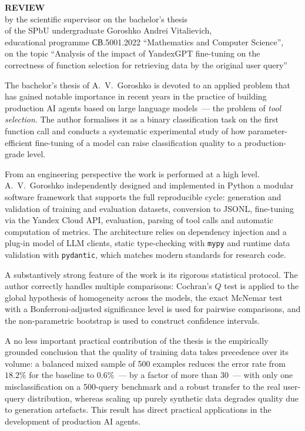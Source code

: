 \documentclass[12pt,a4paper]{article}
\begin{document}
\begin{center}
\Large\textbf{REVIEW}\\[0.3em]
\normalsize by the scientific supervisor on the bachelor's thesis\\
of the SPbU undergraduate Goroshko Andrei Vitalievich,\\
educational programme \mbox{СВ.5001.2022} ``Mathematics and Computer Science'',\\
on the topic ``Analysis of the impact of YandexGPT fine-tuning on the correctness of function selection for retrieving data by the original user query''
\end{center}

\vspace{0.8em}

The bachelor's thesis of A.~V.~Goroshko is devoted to an applied
problem that has gained notable importance in recent years in the
practice of building production AI agents based on large language
models~--- the problem of \textit{tool selection}. The author
formalises it as a binary classification task on the first function
call and conducts a systematic experimental study of how
parameter-efficient fine-tuning of a model can raise classification
quality to a production-grade level.

From an engineering perspective the work is performed at a high level.
A.~V.~Goroshko independently designed and implemented in Python a
modular software framework that supports the full reproducible cycle:
generation and validation of training and evaluation datasets,
conversion to JSONL, fine-tuning via the Yandex Cloud API, evaluation,
parsing of tool calls and automatic computation of metrics. The
architecture relies on dependency injection and a plug-in model of
LLM clients, static type-checking with \texttt{mypy} and runtime data
validation with \texttt{pydantic}, which matches modern standards for
research code.

A substantively strong feature of the work is its rigorous
statistical protocol. The author correctly handles multiple
comparisons: Cochran's $Q$ test is applied to the global hypothesis
of homogeneity across the models, the exact McNemar test with a
Bonferroni-adjusted significance level is used for pairwise
comparisons, and the non-parametric bootstrap is used to construct
confidence intervals.

A no less important practical contribution of the thesis is the
empirically grounded conclusion that the quality of training data
takes precedence over its volume: a balanced mixed sample of 500
examples reduces the error rate from $18.2\%$ for the baseline to
$0.6\%$~--- by a factor of more than $30$~--- with only one
misclassification on a 500-query benchmark and a robust transfer to
the real user-query distribution, whereas scaling up purely synthetic
data degrades quality due to generation artefacts. This result has
direct practical applications in the development of production AI
agents.
\end{document}
